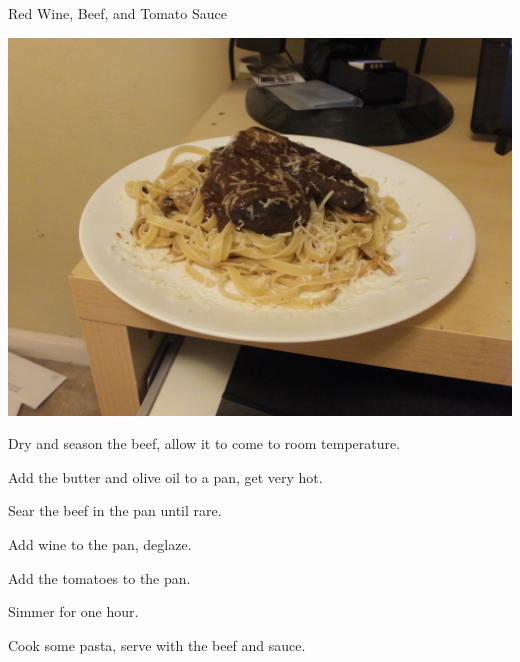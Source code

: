 \documentclass{recipe}
\begin{document}
\begin{recipe}{Red Wine, Beef, and Tomato Sauce}

  \begin{images}
    \includegraphics[width=0.9\linewidth]{beef_wine_pasta-01.jpeg}
  \end{images}

  \begin{ingredients}
  \end{ingredients}

  \begin{steps}
  \item Dry and season the beef, allow it to come to room temperature.
  \item Add the butter and olive oil to a pan, get very hot.
  \item Sear the beef in the pan until rare.
  \item Add wine to the pan, deglaze.
  \item Add the tomatoes to the pan.
  \item Simmer for one hour.
  \item Cook some pasta, serve with the beef and sauce.
  \end{steps}


\end{recipe}
\end{document}
